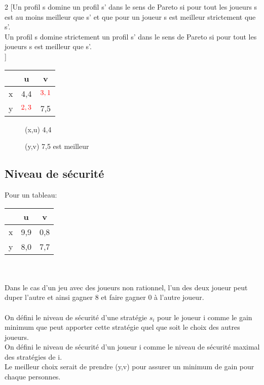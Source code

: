\begin{multicols}{2}
[Un profil s domine un profil s' dans le sens de Pareto si pour tout les joueurs s est au moins meilleur que s' et que pour un joueur s est meilleur strictement que s'.\\
Un profil s domine strictement un profil s' dans le sens de Pareto si pour tout les joueurs s est meilleur que s'.\\
]

\begin{tabular}{c|cc}
$ $ & u & v\\
\hline
x & 4,4 & $\textcolor{red}{3,1}$\\
y & $\textcolor{red}{2,3}$ & 7,5\\
\end{tabular}

\begin{description}
\item[] (x,u) 4,4
\item[] (y,v) 7,5 est meilleur
\end{description}

\end{multicols}

\subsection{Niveau de sécurité}
Pour un tableau:

\begin{tabular}{c|cc}
$ $ & u & v\\
\hline
x & 9,9 & 0,8\\
y & 8,0 & 7,7\\
\end{tabular}
\ \\\\
Dans le cas d'un jeu avec des joueurs non rationnel, l'un des deux joueur peut duper l'autre et ainsi gagner 8 et faire gagner 0 à l'autre joueur. \\\\
On défini le niveau de sécurité d'une stratégie $s_i$ pour le joueur i comme le gain minimum que peut apporter cette stratégie quel que soit le choix des autres joueurs.\\
On défini le niveau de sécurité d'un joueur i comme le niveau de sécurité maximal des stratégies de i.\\

Le meilleur choix serait de prendre (y,v) pour assurer un minimum de gain pour chaque personnes.\\

